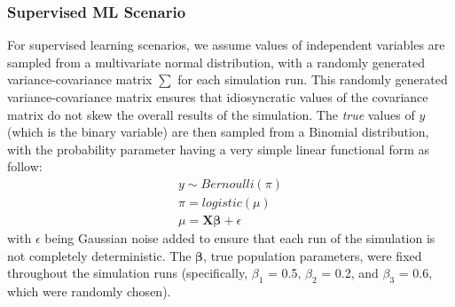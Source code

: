 \documentclass[man, floatsintext, 12pt, a4paper, noextraspace]{apa6}
\begin{document}
    \subsubsection{Supervised ML Scenario}
    For supervised learning scenarios, we assume values of independent variables are sampled from a multivariate normal distribution, with a randomly generated variance-covariance matrix \textbf{$\sum$} for each simulation run. This randomly generated variance-covariance matrix ensures that idiosyncratic values of the covariance matrix do not skew the overall results of the simulation. The \textit{true}  values of $y$ (which is the binary variable) are then sampled from a Binomial distribution, with the probability parameter having a very simple linear functional form as follow: \\
    \begin{equation}
        \begin{gathered}
            y \sim Bernoulli(\pi) \\
            \pi = logistic(\mu) \\
            \mu = \boldsymbol{X\beta} + \epsilon
        \end{gathered}
    \end{equation}
    \noindent with $\epsilon$ being Gaussian noise added to ensure that each run of the simulation is not completely deterministic. The $\boldsymbol{\beta}$, true population parameters, were fixed throughout the simulation runs (specifically, $\beta_1$ = 0.5, $\beta_2$ = 0.2, and $\beta_3$ = 0.6, which were randomly chosen). 
    
\end{document}

